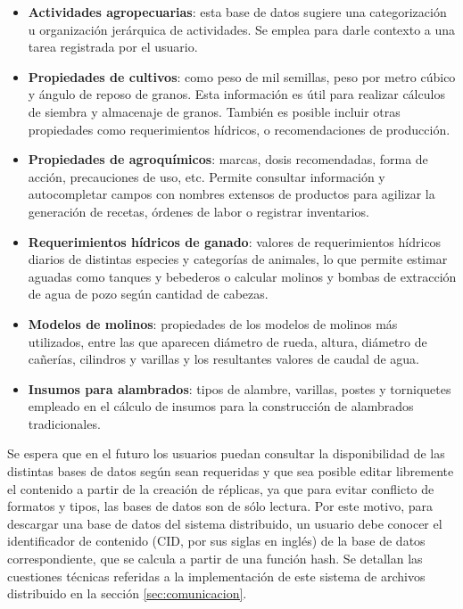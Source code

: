 \begin{itemize}
    \item \textbf{Actividades agropecuarias}: esta base de datos sugiere una categorización u organización jerárquica de actividades. Se emplea para darle contexto a una tarea registrada por el usuario.
    \item \textbf{Propiedades de cultivos}: como peso de mil semillas, peso por metro cúbico y ángulo de reposo de granos. Esta información es útil para realizar cálculos de siembra y almacenaje de granos. También es posible incluir otras propiedades como requerimientos hídricos, o recomendaciones de producción.
    \item \textbf{Propiedades de agroquímicos}: marcas, dosis recomendadas, forma de acción, precauciones de uso, etc. Permite consultar información y autocompletar campos con nombres extensos de productos para agilizar la generación de recetas, órdenes de labor o registrar inventarios.
    \item \textbf{Requerimientos hídricos de ganado}: valores de requerimientos hídricos diarios de distintas especies y categorías de animales, lo que permite estimar aguadas como tanques y bebederos o calcular molinos y bombas de extracción de agua de pozo según cantidad de cabezas.
    \item \textbf{Modelos de molinos}: propiedades de los modelos de molinos más utilizados, entre las que aparecen diámetro de rueda, altura, diámetro de cañerías, cilindros y varillas y los resultantes valores de caudal de agua. 
    \item \textbf{Insumos para alambrados}: tipos de alambre, varillas, postes y torniquetes empleado en el cálculo de insumos para la construcción de alambrados tradicionales.
\end{itemize}    

Se espera que en el futuro los usuarios puedan consultar la disponibilidad de las distintas bases de datos según sean requeridas y que sea posible editar libremente el contenido a partir de la creación de réplicas, ya que para evitar conflicto de formatos y tipos, las bases de datos son de sólo lectura. Por este motivo, para descargar una base de datos del sistema distribuido, un usuario debe conocer el identificador de contenido (CID, por sus siglas en inglés) de la base de datos correspondiente, que se calcula a partir de una función hash. Se detallan las cuestiones técnicas referidas a la implementación de este sistema de archivos distribuido en la sección \ref{sec:comunicacion}.

